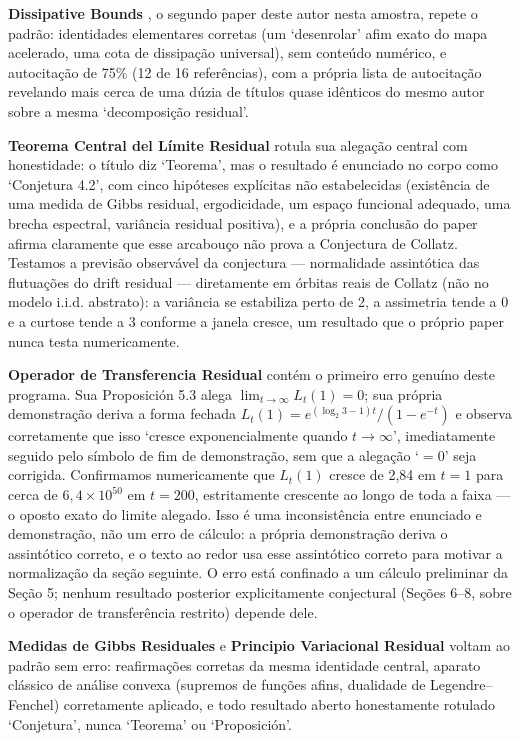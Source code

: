 \documentclass[11pt]{article}
\begin{document}
\textbf{Dissipative Bounds} \cite{RuizCastillo2026b}, o segundo paper
deste autor nesta amostra, repete o padrão: identidades elementares
corretas (um `desenrolar' afim exato do mapa acelerado, uma cota de
dissipação universal), sem conteúdo numérico, e autocitação de 75\%
(12 de 16 referências), com a própria lista de autocitação revelando
mais cerca de uma dúzia de títulos quase idênticos do mesmo autor sobre
a mesma `decomposição residual'.

\textbf{Teorema Central del Límite Residual} \cite{RuizCastillo2026c}
rotula sua alegação central com honestidade: o título diz `Teorema',
mas o resultado é enunciado no corpo como `Conjetura 4.2', com cinco
hipóteses explícitas não estabelecidas (existência de uma medida de
Gibbs residual, ergodicidade, um espaço funcional adequado, uma brecha
espectral, variância residual positiva), e a própria conclusão do paper
afirma claramente que esse arcabouço não prova a Conjectura de Collatz.
Testamos a previsão observável da conjectura --- normalidade
assintótica das flutuações do drift residual --- diretamente em órbitas
reais de Collatz (não no modelo i.i.d. abstrato): a variância se
estabiliza perto de 2, a assimetria tende a 0 e a curtose tende a 3
conforme a janela cresce, um resultado que o próprio paper nunca testa
numericamente.

\textbf{Operador de Transferencia Residual} \cite{RuizCastillo2026d}
contém o primeiro erro genuíno deste programa. Sua Proposición 5.3
alega $\lim_{t\to\infty} L_t(1) = 0$; sua própria demonstração deriva a
forma fechada $L_t(1) = e^{(\log_2 3 - 1)t}/(1-e^{-t})$ e observa
corretamente que isso `cresce exponencialmente quando $t\to\infty$',
imediatamente seguido pelo símbolo de fim de demonstração, sem que a
alegação `$=0$' seja corrigida. Confirmamos numericamente que $L_t(1)$
cresce de 2,84 em $t=1$ para cerca de $6,4\times 10^{50}$ em $t=200$,
estritamente crescente ao longo de toda a faixa --- o oposto exato do
limite alegado. Isso é uma inconsistência entre enunciado e
demonstração, não um erro de cálculo: a própria demonstração deriva o
assintótico correto, e o texto ao redor usa esse assintótico correto
para motivar a normalização da seção seguinte. O erro está confinado a
um cálculo preliminar da Seção 5; nenhum resultado posterior
explicitamente conjectural (Seções 6--8, sobre o operador de
transferência restrito) depende dele.

\textbf{Medidas de Gibbs Residuales} \cite{RuizCastillo2026e} e
\textbf{Principio Variacional Residual} \cite{RuizCastillo2026f} voltam
ao padrão sem erro: reafirmações corretas da mesma identidade central,
aparato clássico de análise convexa (supremos de funções afins,
dualidade de Legendre--Fenchel) corretamente aplicado, e todo resultado
aberto honestamente rotulado `Conjetura', nunca `Teorema' ou
`Proposición'.
\end{document}
